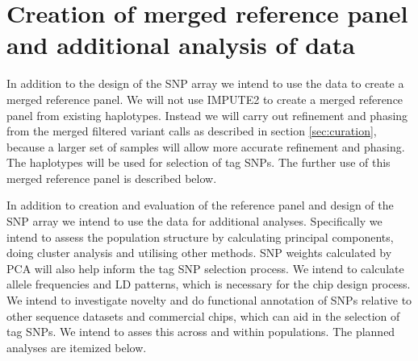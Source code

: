 \section{Creation of merged reference panel and additional analysis of data}

In addition to the design of the SNP array we intend to use the data to create a merged reference panel. We will not use IMPUTE2 to create a merged reference panel from existing haplotypes. Instead we will carry out refinement and phasing from the merged filtered variant calls as described in section \ref{sec:curation}, because a larger set of samples will allow more accurate refinement and phasing. The haplotypes will be used for selection of tag SNPs. The further use of this merged reference panel is described below.

In addition to creation and evaluation of the reference panel and design of the SNP array we intend to use the data for additional analyses. Specifically we intend to assess the population structure by calculating principal components, doing cluster analysis and utilising other methods. SNP weights calculated by PCA will also help inform the tag SNP selection process. We intend to calculate allele frequencies and LD patterns, which is necessary for the chip design process. We intend to investigate novelty and do functional annotation of SNPs relative to other sequence datasets and commercial chips, which can aid in the selection of tag SNPs. We intend to asses this across and within populations. The planned analyses are itemized below.

